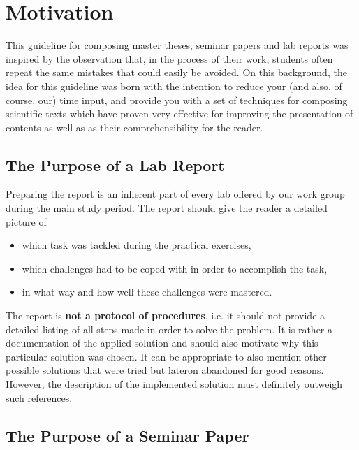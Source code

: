 \chapter{Motivation}

This guideline for composing master theses, seminar papers and lab reports was
inspired by the observation that, in the process of their work, students often
repeat the same mistakes that could easily be avoided. On this background, the
idea for this guideline was born with the intention to reduce your (and also,
of course, our) time input, and provide you with a set of techniques for composing
scientific texts which have proven very effective for improving the presentation of
contents as well as as their comprehensibility for the reader.


\section{The Purpose of a Lab Report}

Preparing the report is an inherent part of every lab offered by our work group
during the main study period. The report should give the reader a detailed picture of
 
\begin{itemize}
\item which task was tackled during the practical exercises,
\item which challenges had to be coped with in order to accomplish the task,
\item in what way and how well these challenges were mastered.
\end{itemize}

The report is \textbf{not a protocol of procedures}, i.e. it should not provide a
detailed listing of all steps made in order to solve the problem. It is rather a
documentation of the applied solution and should also motivate why this particular
solution was chosen. It can be appropriate to also mention other possible solutions
that were tried but lateron abandoned for good reasons. However, the description of
the implemented solution must definitely outweigh such references.


\section{The Purpose of a Seminar Paper}

